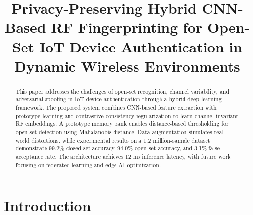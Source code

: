 \documentclass[conference]{IEEEtran}
\begin{document}
\title{Privacy-Preserving Hybrid CNN-Based RF Fingerprinting for Open-Set IoT Device Authentication in Dynamic Wireless Environments}

\author{
}

\maketitle

\begin{abstract}
This paper addresses the challenges of open-set recognition, channel variability, and adversarial spoofing in IoT device authentication through a hybrid deep learning framework. The proposed system combines CNN-based feature extraction with prototype learning and contrastive consistency regularization to learn channel-invariant RF embeddings. A prototype memory bank enables distance-based thresholding for open-set detection using Mahalanobis distance. Data augmentation simulates real-world distortions, while experimental results on a 1.2 million-sample dataset demonstrate 99.2\% closed-set accuracy, 94.0\% open-set accuracy, and 3.1\% false acceptance rate. The architecture achieves 12 ms inference latency, with future work focusing on federated learning and edge AI optimization.
\end{abstract}

\begin{IEEEkeywords}
\end{IEEEkeywords}


\section{Introduction}
\end{document}
